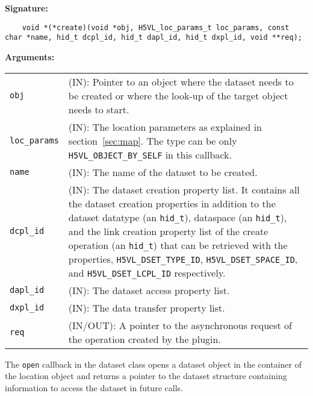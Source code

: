 \begin{mdframed}[style=bgbox]
\textbf{Signature:}
\begin{lstlisting}
    void *(*create)(void *obj, H5VL_loc_params_t loc_params, const char *name, hid_t dcpl_id, hid_t dapl_id, hid_t dxpl_id, void **req);
\end{lstlisting}

\textbf{Arguments:}\\
\begin{tabular}{l p{10cm}}
  \texttt{obj} & (IN): Pointer to an object where the dataset needs
  to be created or where the look-up of the target object needs to
  start.\\
  \texttt{loc\_params} & (IN): The location parameters as explained in
  section~\ref{sec:map}. The type can be only \texttt{H5VL\_OBJECT\_BY\_SELF} in this callback. \\
  \texttt{name} & (IN): The name of the dataset to be created.\\
  \texttt{dcpl\_id} & (IN): The dataset creation property list. It contains
  all the dataset creation properties in addition to the dataset
  datatype (an \texttt{hid\_t}), dataspace (an \texttt{hid\_t}), and the
  link creation property list of the create operation (an \texttt{hid\_t}) that can be retrieved with the properties, \texttt{H5VL\_DSET\_TYPE\_ID}, \texttt{H5VL\_DSET\_SPACE\_ID},  and \texttt{H5VL\_DSET\_LCPL\_ID} respectively.\\
  \texttt{dapl\_id} & (IN): The dataset access property list.\\
  \texttt{dxpl\_id} & (IN): The data transfer property list.\\
  \texttt{req} & (IN/OUT): A pointer to the asynchronous request of the
  operation created by the plugin.\\
\end{tabular}
\end{mdframed}

The \texttt{open} callback in the dataset class opens a dataset
object in the container of the location object and returns a pointer
to the dataset structure containing information to access the dataset
in future calls.\bigskip

